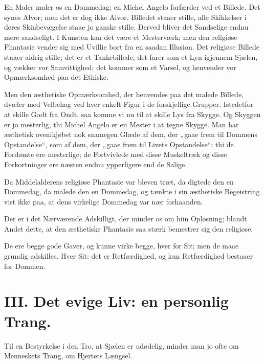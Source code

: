 \documentclass[12pt,a4paper]{book}
\newcommand{\apage}[1]{\marginnote{\footnotesize\textit{[#1]}}}
\begin{document}
En Maler maler os en Dommedag; en Michel Angelo forfærder ved et Billede. Det
synes Alvor; men det er dog ikke Alvor. Billedet staaer stille, alle
Skikkelser i deres Skinbevægelse staae jo ganske stille. Derved bliver det
Sandselige endnu mere sandseligt. I Kunsten kan det være et Mesterværk; men
den religiøse Phantasie vender sig med Uvillie bort fra en saadan Illusion.
Det religiøse Billede staaer aldrig stille; det er et Tankebillede; det farer
som et Lyn \apage{22} igjennem
Sjælen, og vækker vor Samvittighed; det kommer som et Varsel, og henvender
vor Opmærksomhed paa det Ethiske.

Men den æsthetiske Opmærksomhed, der henvendes paa det malede Billede,
dvæler med Velbehag ved hver enkelt Figur i de forskjellige Grupper.
Istedetfor at skille Godt fra Ondt, saa komme vi nu til at skille Lys fra
Skygge. Og Skyggen er jo mesterlig, thi Michel Angelo er en Mester i at tegne
Skygge. Man har æsthetisk ovenikjøbet nok saamegen Glæde af dem, der „gaae
frem til Dommens Opstandelse“, som af dem, der „gaae frem til Livets
Opstandelse“; thi de Fordømte ere mesterlige; de Fortvivlede med disse
Muskeltræk og disse Forkortninger ere næsten endnu ypperligere end de Salige.

Da Middelalderens religiøse Phantasie var bleven træt, da digtede den en
Dommedag, da malede den en Dommedag, og tænkte i sin æsthetiske Begeistring
vist ikke paa, at dens virkelige Dommedag var nær forhaanden.

Der er i det Nærværende Adskilligt, der minder os om hiin Opløsning; blandt
Andet dette, at den æsthetiske Phantasie saa stærk bemestrer sig den
religiøse.

De ere begge gode Gaver, og kunne virke begge, hver for Sit; men de maae
grundig adskilles. Hver Sit: det er Retfærdighed, og kun Retfærdighed
bestaaer for Dommen.

\chapter*{III. Det evige Liv: en personlig Trang.}
\label{ch:forel3} \apage{23}

Til en Bestyrkelse i den Tro, at Sjælen er udødelig, minder man jo ofte om
Menneskets Trang, om Hjertets Længsel.
\end{document}
